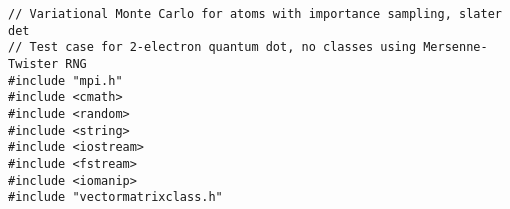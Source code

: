 \documentclass{beamer}
\begin{document}
\begin{frame}
\begin{block}{}








































































































\begin{verbatim}
// Variational Monte Carlo for atoms with importance sampling, slater det
// Test case for 2-electron quantum dot, no classes using Mersenne-Twister RNG
#include "mpi.h"
#include <cmath>
#include <random>
#include <string>
#include <iostream>
#include <fstream>
#include <iomanip>
#include "vectormatrixclass.h"


\end{verbatim}
\end{block}
\end{frame}
\end{document}
